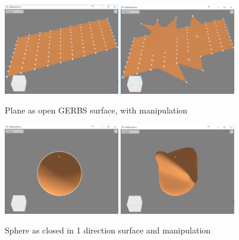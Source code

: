 \documentclass[a4,10pt]{article}
\begin{document}
\begin{figure}[H]
	\centering
	\includegraphics[width=0.45\textwidth]{gfx/Plane1.png}
	\includegraphics[width=0.45\textwidth]{gfx/Plane2.png}
	\caption{Plane as open GERBS surface, with manipulation}
	\label{fig:plane}
\end{figure}
\begin{figure}[H]
	\centering
	\includegraphics[width=0.45\textwidth]{gfx/sph1.png}
	\includegraphics[width=0.45\textwidth]{gfx/sph2.png}
	\caption{Sphere as closed in 1 direction surface and manipulation}
	\label{fig:sphere}
\end{figure}
\end{document}
